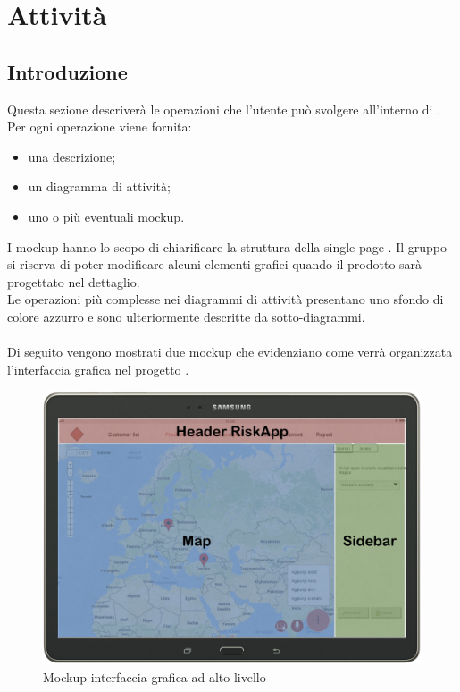 \newpage
\section{Attività}
\subsection{Introduzione}
Questa sezione descriverà le operazioni che l'utente può svolgere all'interno di \progetto.
\\Per ogni operazione viene fornita:
\begin{itemize}
	\item una descrizione;
	\item un diagramma di attività;
	\item uno o più eventuali mockup.
\end{itemize}
I mockup hanno lo scopo di chiarificare la struttura della single-page \progetto. Il gruppo si riserva di poter modificare alcuni elementi grafici quando il prodotto sarà progettato nel dettaglio.
\\Le operazioni più complesse nei diagrammi di attività presentano uno sfondo di colore azzurro e sono ulteriormente descritte da sotto-diagrammi. \\ \\
%
Di seguito vengono mostrati due mockup che evidenziano come verrà organizzata l'interfaccia grafica nel progetto \progetto.
\begin{figure}[H]
	\centering
	\includegraphics[scale=0.4]{img/MockUp/MockupConLayerHi}
	\caption{Mockup interfaccia grafica ad alto livello}
\end{figure}

